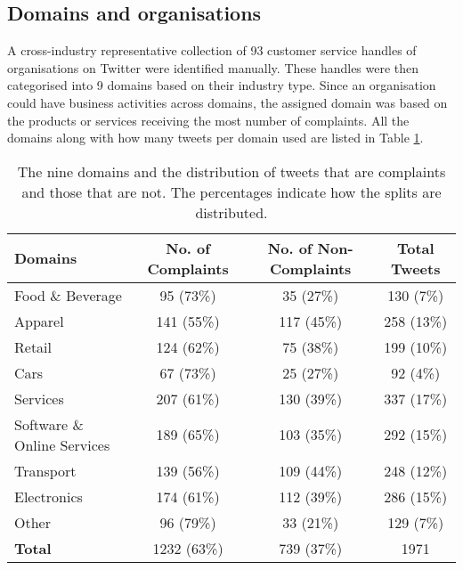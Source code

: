 \subsection{Domains and organisations}
A cross-industry representative collection of 93 customer service handles of organisations on Twitter were identified manually. These handles were then categorised into 9 domains based on their industry type. Since an organisation could have business activities across domains, the assigned domain was based on the products or services receiving the most number of complaints. All the domains along with how many tweets per domain used are listed in Table \ref{tab: domains}. 
\begin{table}[ht]
    \centering
    \begin{tabular}{|l|c|c|c|}
    \hline
    \rowcolor[gray]{0.7}
    \textbf{Domains} & \textbf{No. of Complaints} & \textbf{No. of Non-Complaints} & \textbf{Total Tweets}\\
    \hline
    Food \& Beverage & 95 (73\%) & 35 (27\%) & 130 (7\%)\\
    \rowcolor[gray]{0.9}
    Apparel & 141 (55\%) & 117 (45\%) & 258 (13\%)\\
    Retail & 124 (62\%)& 75 (38\%) & 199 (10\%)\\
    \rowcolor[gray]{0.9}
    Cars & 67 (73\%)& 25 (27\%) & 92 (4\%)\\
    Services  & 207 (61\%)& 130 (39\%) & 337 (17\%)\\
    \rowcolor[gray]{0.9}
    Software \& Online Services & 189 (65\%)& 103 (35\%) & 292 (15\%)\\
    Transport & 139 (56\%)& 109 (44\%) & 248 (12\%)\\
    \rowcolor[gray]{0.9}
    Electronics & 174 (61\%)& 112 (39\%) & 286 (15\%)\\
    Other & 96 (79\%)& 33 (21\%) & 129 (7\%)\\
    \hline
    \rowcolor[gray]{0.9}
    \textbf{Total} & 1232 (63\%)& 739 (37\%) & 1971\\
    \hline
    \end{tabular}
    \caption{The nine domains and the distribution of tweets that are complaints and those that are not. The percentages indicate how the splits are distributed.}    
    \label{tab: domains}
\end{table}  
\newline
